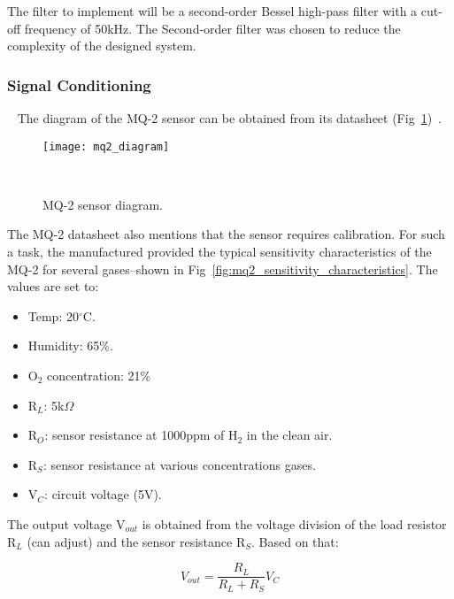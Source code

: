 The filter to implement will be a second-order Bessel high-pass filter with a cut-off frequency of 50kHz. The Second-order filter was chosen to reduce the complexity of the designed system.

\newpage

\subsubsection{Signal Conditioning}
~\label{sec:methodology:dev_methodology:sc}
\hspace{8pt}
The diagram of the MQ-2 sensor can be obtained from its datasheet (Fig~\ref{fig:mq2_diagram})~\cite{mq2_datasheet}.

\begin{figure}[ht]
    \centering\texttt{[image: mq2\_diagram]}
    \caption{MQ-2 sensor diagram.}
~\label{fig:mq2_diagram}
\end{figure}

The MQ-2 datasheet also mentions that the sensor requires calibration. For such a task, the manufactured provided the typical sensitivity characteristics of the MQ-2 for several gases--shown in Fig~\ref{fig:mq2_sensitivity_characteristics}. The values are set to:

\begin{itemize}
    \item Temp: 20$^{\circ}$C.

    \item Humidity: 65\%.

    \item O$_{2}$ concentration: 21\%

    \item R$_{L}$: 5k$\Omega$

    \item R$_{O}$: sensor resistance at 1000ppm of H$_{2}$ in the clean air.

    \item R$_{S}$: sensor resistance at various concentrations gases.

    \item V$_{C}$: circuit voltage (5V). \\
\end{itemize}

The output voltage V$_{out}$ is obtained from the voltage division of the load resistor R$_{L}$ (can adjust) and the sensor resistance R$_{S}$. Based on that:

\begin{equation}
    V_{out} = \frac{R_{L}}{R_{L} + R_{S}} V_{C}
    \label{eq:voltage_division}
\end{equation}

